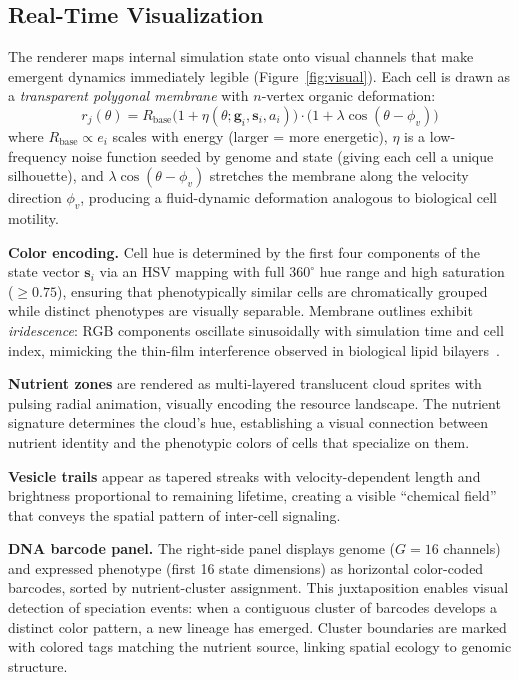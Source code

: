 \documentclass[10pt,twocolumn]{article}
\begin{document}
\subsection{Real-Time Visualization}
\label{sec:visualization}

The renderer maps internal simulation state onto visual channels that make emergent dynamics immediately legible (Figure~\ref{fig:visual}).
Each cell is drawn as a \emph{transparent polygonal membrane} with $n$-vertex organic deformation:
\begin{equation}
  r_j(\theta) = R_{\text{base}} \bigl(1 + \eta(\theta; \mathbf{g}_i, \mathbf{s}_i, a_i)\bigr) \cdot \bigl(1 + \lambda \cos(\theta - \phi_v)\bigr)
\end{equation}
where $R_{\text{base}} \propto e_i$ scales with energy (larger = more energetic), $\eta$ is a low-frequency noise function seeded by genome and state (giving each cell a unique silhouette), and $\lambda \cos(\theta - \phi_v)$ stretches the membrane along the velocity direction $\phi_v$, producing a fluid-dynamic deformation analogous to biological cell motility.

\textbf{Color encoding.}
Cell hue is determined by the first four components of the state vector $\mathbf{s}_i$ via an HSV mapping with full $360^\circ$ hue range and high saturation ($\geq 0.75$), ensuring that phenotypically similar cells are chromatically grouped while distinct phenotypes are visually separable.
Membrane outlines exhibit \emph{iridescence}: RGB components oscillate sinusoidally with simulation time and cell index, mimicking the thin-film interference observed in biological lipid bilayers~\cite{vanniel2018shedding}.

\textbf{Nutrient zones} are rendered as multi-layered translucent cloud sprites with pulsing radial animation, visually encoding the resource landscape.
The nutrient signature determines the cloud's hue, establishing a visual connection between nutrient identity and the phenotypic colors of cells that specialize on them.

\textbf{Vesicle trails} appear as tapered streaks with velocity-dependent length and brightness proportional to remaining lifetime, creating a visible ``chemical field'' that conveys the spatial pattern of inter-cell signaling.

\textbf{DNA barcode panel.}
The right-side panel displays genome ($G = 16$ channels) and expressed phenotype (first 16 state dimensions) as horizontal color-coded barcodes, sorted by nutrient-cluster assignment.
This juxtaposition enables visual detection of speciation events: when a contiguous cluster of barcodes develops a distinct color pattern, a new lineage has emerged.
Cluster boundaries are marked with colored tags matching the nutrient source, linking spatial ecology to genomic structure.
\end{document}
